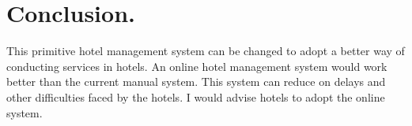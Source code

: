 \documentclass{article}
\begin{document}
\section{Conclusion.}
{This primitive hotel management system can be changed to adopt a better way of conducting services in hotels. An online hotel management system would work better than the current manual system. This system can reduce on delays and other difficulties faced by the hotels.
I would advise hotels to adopt the online system.
}
\end{document}
